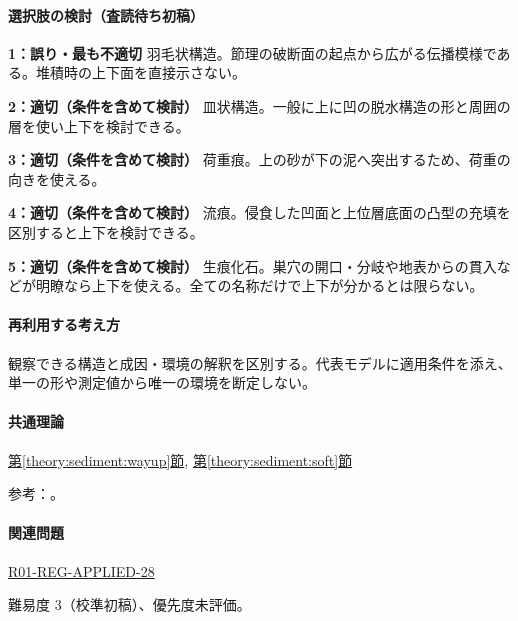 \paragraph{選択肢の検討（査読待ち初稿）}\mbox{}\par

\noindent\textbf{1：誤り・最も不適切} 羽毛状構造。節理の破断面の起点から広がる伝播模様である。堆積時の上下面を直接示さない。\par

\noindent\textbf{2：適切（条件を含めて検討）} 皿状構造。一般に上に凹の脱水構造の形と周囲の層を使い上下を検討できる。\par

\noindent\textbf{3：適切（条件を含めて検討）} 荷重痕。上の砂が下の泥へ突出するため、荷重の向きを使える。\par

\noindent\textbf{4：適切（条件を含めて検討）} 流痕。侵食した凹面と上位層底面の凸型の充填を区別すると上下を検討できる。\par

\noindent\textbf{5：適切（条件を含めて検討）} 生痕化石。巣穴の開口・分岐や地表からの貫入などが明瞭なら上下を使える。全ての名称だけで上下が分かるとは限らない。\par

\paragraph{再利用する考え方} 観察できる構造と成因・環境の解釈を区別する。代表モデルに適用条件を添え、単一の形や測定値から唯一の環境を断定しない。

\paragraph{共通理論} \hyperref[theory:sediment:wayup]{第\ref*{theory:sediment:wayup}節}, \hyperref[theory:sediment:soft]{第\ref*{theory:sediment:soft}節}

\par 参考：\cite{sed_plumose_michigan,sed_mit_environment,sed_houston_structures}。

\paragraph{関連問題} \hyperref[q:r01-reg-applied-28]{R01-REG-APPLIED-28}

\par 難易度 3（校準初稿）、優先度未評価。
